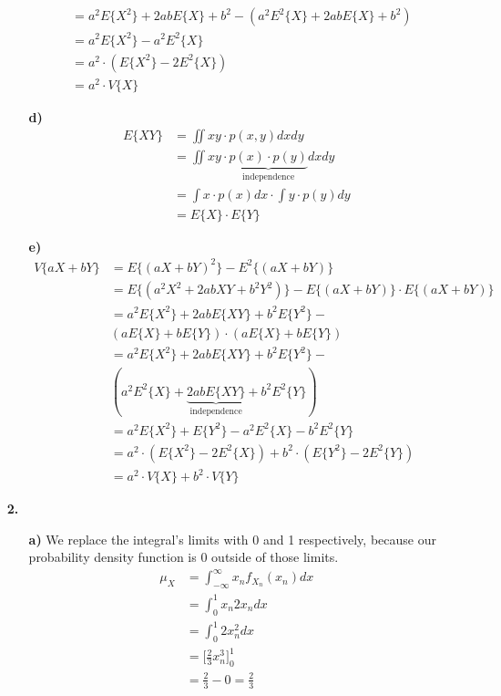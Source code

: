 \documentclass[a4paper,11pt]{article}
\begin{document}
\begin{enumerate}
\begin{enumerate}
\begin{align*}
		&= a^2E\lbrace X^2 \rbrace + 2abE\lbrace X \rbrace + b^2 - (a^2E^2\lbrace X \rbrace + 2abE\lbrace X \rbrace + b^2) \\
		&= a^2E\lbrace X^2 \rbrace - a^2E^2\lbrace X \rbrace \\
		&= a^2 \cdot (E\lbrace X^2 \rbrace - 2E^2\lbrace X \rbrace) \\
		&= a^2 \cdot V\lbrace X \rbrace
		\end{align*}
		\item[\textbf{d)}]
		\begin{align*}
		E\lbrace XY \rbrace &= \iint xy \cdot p(x,y) dxdy \\
		&= \iint xy \cdot \underbrace{p(x) \cdot p(y)}_{\text{independence}} dxdy \\
		&= \int x \cdot p(x) dx \cdot \int y \cdot p(y) dy \\
		&= E\lbrace X \rbrace \cdot E\lbrace Y \rbrace
		\end{align*}
		\item[\textbf{e)}]
		\begin{align*}
		V\lbrace aX + bY \rbrace &= E\lbrace (aX + bY)^2 \rbrace - E^2\lbrace (aX + bY) \rbrace \\
		&= E\lbrace (a^2X^2 + 2abXY + b^2Y^2) \rbrace - E\lbrace (aX + bY) \rbrace \cdot
		E\lbrace (aX + bY) \rbrace \\
		&= a^2E\lbrace X^2 \rbrace + 2abE\lbrace XY \rbrace + b^2E\lbrace Y^2 \rbrace - \\ &(aE\lbrace X \rbrace + bE\lbrace Y \rbrace) \cdot (aE\lbrace X \rbrace + bE\lbrace Y \rbrace) \\
		&= a^2E\lbrace X^2 \rbrace + 2abE\lbrace XY \rbrace + b^2E\lbrace Y^2 \rbrace - \\ &(a^2E^2\lbrace X \rbrace + \underbrace{2abE\lbrace XY \rbrace}_{\text{independence}} + b^2E^2\lbrace Y \rbrace) \\
		&= a^2E\lbrace X^2 \rbrace + E\lbrace Y^2 \rbrace - a^2E^2\lbrace X \rbrace - b^2E^2\lbrace Y \rbrace\\
		&= a^2 \cdot (E\lbrace X^2 \rbrace - 2E^2\lbrace X \rbrace) + b^2 \cdot (E\lbrace Y^2 \rbrace - 2E^2\lbrace Y \rbrace) \\
		&= a^2 \cdot V\lbrace X \rbrace + b^2 \cdot V\lbrace Y \rbrace
		\end{align*}
		\end{enumerate}

		\item[\textbf{2.}]
		\begin{enumerate}
			\item[\textbf{a)}]
			We replace the integral's limits with 0 and 1 respectively, because
			our probability density function is 0 outside of those limits.
			\begin{align*}
				\mu_X &= \int_{-\infty}^\infty x_n f_{X_n}(x_n) dx \\
					  &= \int_0^1 x_n 2x_n dx \\
					  &= \int_0^1 2x_n^2 dx \\
					  &= \bigg[ \frac{2}{3} x_n^3 \bigg]_0^1 \\
					  &= \frac{2}{3} - 0 = \frac{2}{3}
			\end{align*}


\end{enumerate}
\end{enumerate}
\end{document}
